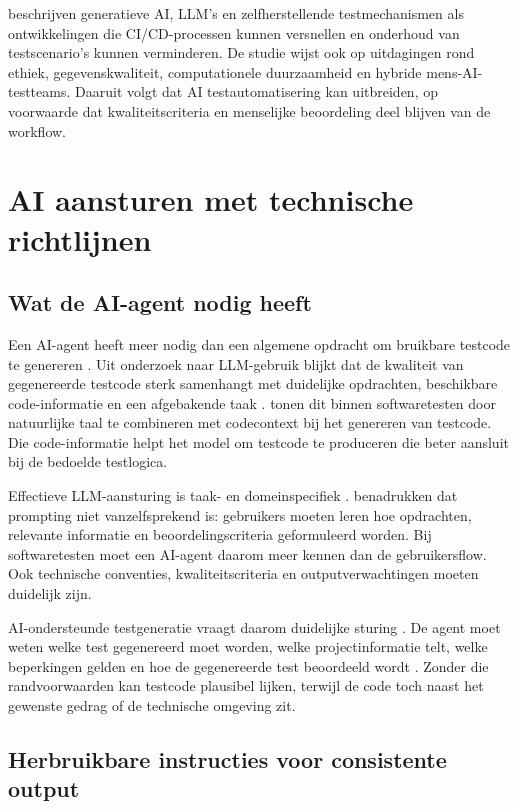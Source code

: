 \textcite{Pacholi2025} beschrijven generatieve AI, LLM's en zelfherstellende testmechanismen als ontwikkelingen die CI/CD-processen kunnen versnellen en onderhoud van testscenario's kunnen verminderen. De studie wijst ook op uitdagingen rond ethiek, gegevenskwaliteit, computationele duurzaamheid en hybride mens-AI-testteams. Daaruit volgt dat AI testautomatisering kan uitbreiden, op voorwaarde dat kwaliteitscriteria en menselijke beoordeling deel blijven van de workflow.

\section{AI aansturen met technische richtlijnen}

\subsection{Wat de AI-agent nodig heeft}

Een AI-agent heeft meer nodig dan een algemene opdracht om bruikbare testcode te genereren \autocite{SaezIznaga2025,Ognibene2025}. Uit onderzoek naar LLM-gebruik blijkt dat de kwaliteit van gegenereerde testcode sterk samenhangt met duidelijke opdrachten, beschikbare code-informatie en een afgebakende taak \autocite{SaezIznaga2025}. \textcite{SaezIznaga2025} tonen dit binnen softwaretesten door natuurlijke taal te combineren met codecontext bij het genereren van testcode. Die code-informatie helpt het model om testcode te produceren die beter aansluit bij de bedoelde testlogica.

Effectieve LLM-aansturing is taak- en domeinspecifiek \autocite{Ognibene2025}. \textcite{Ognibene2025} benadrukken dat prompting niet vanzelfsprekend is: gebruikers moeten leren hoe opdrachten, relevante informatie en beoordelingscriteria geformuleerd worden. Bij softwaretesten moet een AI-agent daarom meer kennen dan de gebruikersflow. Ook technische conventies, kwaliteitscriteria en outputverwachtingen moeten duidelijk zijn.

AI-ondersteunde testgeneratie vraagt daarom duidelijke sturing \autocite{Ognibene2025}. De agent moet weten welke test gegenereerd moet worden, welke projectinformatie telt, welke beperkingen gelden en hoe de gegenereerde test beoordeeld wordt \autocite{Ognibene2025}. Zonder die randvoorwaarden kan testcode plausibel lijken, terwijl de code toch naast het gewenste gedrag of de technische omgeving zit.

\subsection{Herbruikbare instructies voor consistente output}

